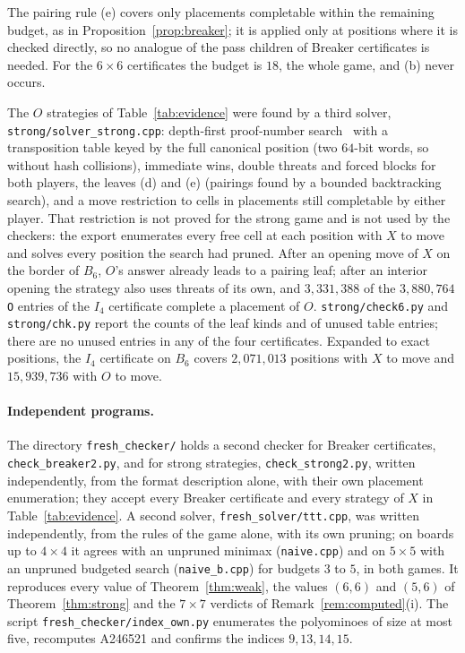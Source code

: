 \documentclass[11pt]{article}
\theoremstyle{definition}
\theoremstyle{remark}
\newcommand{\file}[1]{\texttt{#1}}
\begin{document}
The pairing rule (e) covers only placements completable within the remaining budget, as in
Proposition~\ref{prop:breaker}; it is applied only at positions where it is checked directly, so no
analogue of the pass children of Breaker certificates is needed. For the $6\times 6$ certificates
the budget is $18$, the whole game, and (b) never occurs.

The $O$ strategies of Table~\ref{tab:evidence} were found by a third solver,
\file{strong/solver\_strong.cpp}: depth-first proof-number search~\cite{Nag02} with a transposition
table keyed by the full canonical position (two $64$-bit words, so without hash collisions),
immediate wins, double threats and forced blocks for both players, the leaves (d) and (e) (pairings
found by a bounded backtracking search), and a move restriction to cells in placements still
completable by either player. That restriction is not proved for the strong game and is not used by
the checkers: the export enumerates every free cell at each position with $X$ to move and solves
every position the search had pruned. After an opening move of $X$ on the border of $B_6$, $O$'s
answer already leads to a pairing leaf; after an interior opening the strategy also uses threats of its own,
and $3{,}331{,}388$ of the $3{,}880{,}764$ \texttt{O} entries of the $I_4$ certificate complete a
placement of $O$. \file{strong/check6.py} and \file{strong/chk.py} report the counts of the leaf
kinds and of unused table entries; there are no unused entries in any of the four certificates. Expanded to exact positions, the $I_4$ certificate on $B_6$ covers
$2{,}071{,}013$ positions with $X$ to move and $15{,}939{,}736$ with $O$ to move.

\paragraph{Independent programs.} The directory \file{fresh\_checker/} holds a second checker for
Breaker certificates, \file{check\_breaker2.py}, and for strong strategies,
\file{check\_strong2.py}, written independently, from the format description alone, with their own
placement enumeration; they accept every Breaker certificate and every strategy of $X$ in
Table~\ref{tab:evidence}. A second solver,
\file{fresh\_solver/ttt.cpp}, was written independently, from the rules of the game alone, with its own pruning; on boards
up to $4\times4$ it agrees with an unpruned minimax (\file{naive.cpp}) and on $5\times 5$ with an
unpruned budgeted search (\file{naive\_b.cpp}) for budgets $3$ to $5$, in both games. It reproduces
every value of Theorem~\ref{thm:weak}, the values $(6,6)$ and $(5,6)$ of Theorem~\ref{thm:strong}
and the $7\times 7$ verdicts of Remark~\ref{rem:computed}(i). The script \file{fresh\_checker/index\_own.py} enumerates
the polyominoes of size at most five, recomputes A246521 and confirms the indices $9,13,14,15$.
\end{document}
